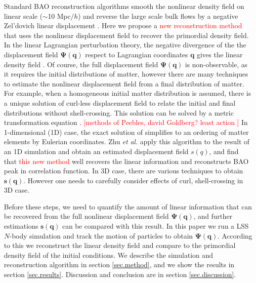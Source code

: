 \documentclass[aps,prd,twocolumn,superscriptaddress,amsfont,amssymb,amsmath,nofootinbib,showpacs,balancelastpage]{revtex4-1}
\newcommand{\bs}{\boldsymbol}
\newcommand{\tcr}{\textcolor{red}}
\begin{document}
Standard BAO reconstruction algorithms smooth the 
nonlinear density field on linear scale ($\sim$10 Mpc$/h$) and reverse the large 
scale bulk flows by a negative Zel'dovich linear displacement
\citep{2007ApJ...664..675E,2009PhRvD..80l3501N,2009PhRvD..79f3523P}. Here we propose a 
\tcr{new reconstruction method} that uses the nonlinear displacement field to recover the 
primordial density field. In the linear Lagrangian perturbation theory, the 
negative divergence of the the displacement field
$\bs\Psi(\bs q)$ respect to Lagrangian coordinates $\bs q$
gives the linear density field \tcr{\citep{2010PhDT.........4J}}.
Of course, the full displacement field $\bs\Psi(\bs q)$
is non-observable, as it requires the initial distributions of matter, however there are 
many techniques to estimate the nonlinear displacement field from a final 
distribution of matter. For example, when a homogeneous initial matter distribution 
is assumed, there is a unique solution of curl-less displacement field to relate 
the initial and final distributions without shell-crossing. This solution can be 
solved by a metric transformation equation \citep{1995ApJS..100..269P,1998ApJS..115...19P}.
\cite{1989ApJ...344L..53P,2000ApJ...544...21G}
\tcr{[methods of Peebles, david Goldberg? least action ]}
In 1-dimensional (1D) case, the exact solution of \cite{1995ApJS..100..269P}
simplifies to an ordering of matter elements by Eulerian coordinates.
Zhu {\it et al.} \cite{2016arXiv160907041Z} apply this algorithm to the result
of an 1D simulation \citep{2016JCAP...01..043M} and obtain an estimated
displacement field $s(q)$, and find that \tcr{this new method} well recovers the linear
information and reconstructs BAO peak in correlation function. 
In 3D case, there are various techniques to obtain $\bs s(\bs q)$.
However one needs to carefully consider effects of curl, shell-crossing in 3D case.

Before these steps, we need to quantify the amount of linear information
that can be recovered from the full nonlinear displacement field $\bs\Psi(\bs q)$,
and further estimations $\bs s(\bs q)$ can be compared with this result.
In this paper we run a LSS $N$-body simulation and track the motion of
particles to obtain $\bs\Psi(\bs q)$. According to this we reconstruct the linear density
field and compare to the primordial density field of the initial
conditions. We describe the simulation and reconstruction algorithm in section
\ref{sec.method}, and we show the results in section \ref{sec.results}.
Discussion and conclusion are in section \ref{sec.discussion}.
\end{document}
